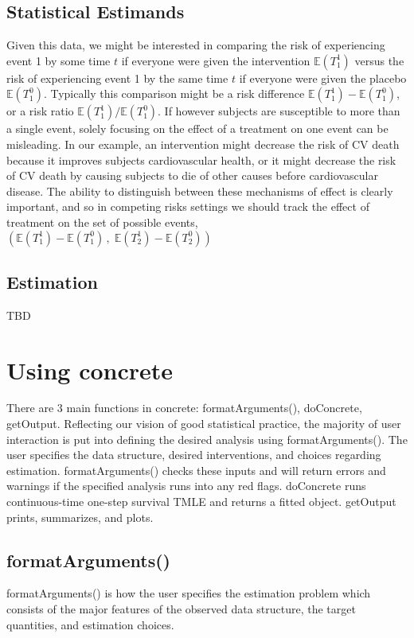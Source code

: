 \documentclass{report}
\newcommand{\1}{\ensuremath{\mathbf{1}}}
\begin{document}
\subsection{Statistical Estimands}
\label{sec:org96512b9}

Given this data, we might be interested in comparing the risk of experiencing event 1 by some time \(t\) if everyone were given the intervention \(\mathbb{E}(T^1_1)\) versus the risk of experiencing event 1 by the same time \(t\) if everyone were given the placebo \(\mathbb{E}(T^0_1)\). Typically this comparison might be a risk difference \(\mathbb{E}(T^1_1) - \mathbb{E}(T^0_1)\), or a risk ratio \(\mathbb{E}(T^1_1) / \mathbb{E}(T^0_1)\).
If however subjects are susceptible to more than a single event, solely focusing on the effect of a treatment on one event can be misleading. In our example, an intervention might decrease the risk of CV death because it improves subjects cardiovascular health, or it might decrease the risk of CV death by causing subjects to die of other causes before cardiovascular disease. The ability to distinguish between these mechanisms of effect is clearly important, and so in competing risks settings we should track the effect of treatment on the set of possible events, \(\left(\mathbb{E}(T^1_1) - \mathbb{E}(T^0_1)\,,\;\mathbb{E}(T^1_2) - \mathbb{E}(T^0_2)\right)\)

\subsection{Estimation}
\label{sec:org72d852d}
TBD

\section{Using concrete}
\label{sec:org0dfa218}

There are 3 main functions in concrete: formatArguments(), doConcrete, getOutput. Reflecting our vision of good statistical practice, the majority of user interaction is put into defining the desired analysis using formatArguments(). The user specifies the data structure, desired interventions, and choices regarding estimation. formatArguments() checks these inputs and will return errors and warnings if the specified analysis runs into any red flags. doConcrete runs continuous-time one-step survival TMLE and returns a fitted object. getOutput prints, summarizes, and plots.  

\subsection{formatArguments()}
\label{sec:org37d6f66}
formatArguments() is how the user specifies the estimation problem which consists of the major features of the observed data structure, the target quantities, and estimation choices.
\end{document}
